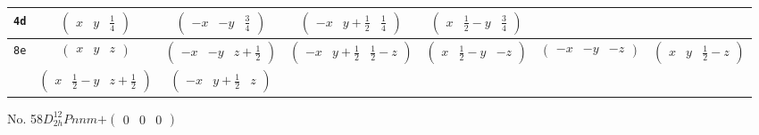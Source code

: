 \documentclass[fleqn,9pt,landscape]{jsarticle}
\begin{document}
\begin{center}
\begin{longtable}{ccccccc}
{\tt 4d} & $ \begin{pmatrix} x & y & \frac{1}{4} \end{pmatrix} $ & $ \begin{pmatrix} - x & - y & \frac{3}{4} \end{pmatrix} $ & $ \begin{pmatrix} - x & y + \frac{1}{2} & \frac{1}{4} \end{pmatrix} $ & $ \begin{pmatrix} x & \frac{1}{2} - y & \frac{3}{4} \end{pmatrix} $ & $  $ & $  $ \\ \hline
{\tt 8e} & $ \begin{pmatrix} x & y & z \end{pmatrix} $ & $ \begin{pmatrix} - x & - y & z + \frac{1}{2} \end{pmatrix} $ & $ \begin{pmatrix} - x & y + \frac{1}{2} & \frac{1}{2} - z \end{pmatrix} $ & $ \begin{pmatrix} x & \frac{1}{2} - y & - z \end{pmatrix} $ & $ \begin{pmatrix} - x & - y & - z \end{pmatrix} $ & $ \begin{pmatrix} x & y & \frac{1}{2} - z \end{pmatrix} $ \\
& $ \begin{pmatrix} x & \frac{1}{2} - y & z + \frac{1}{2} \end{pmatrix} $ & $ \begin{pmatrix} - x & y + \frac{1}{2} & z \end{pmatrix} $ & $  $ & $  $ & $  $ & $  $ \\
\end{longtable}
\end{center}
\newpage
No. 58\quad$D_{2h}^{12}$\quad$Pnnm$\quad[ orthorhombic ]\quad$+\begin{pmatrix} 0 & 0 & 0 \end{pmatrix}$
\end{document}
